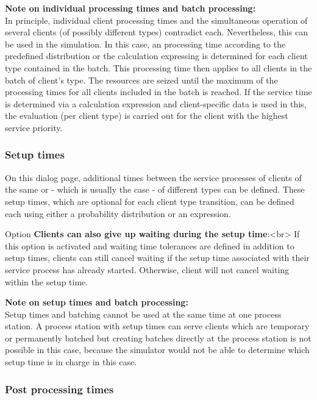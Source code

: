\textbf{Note on individual processing times and batch processing:}~\\
In principle, individual client processing times and the simultaneous operation of several clients
(of possibly different types) contradict each. Nevertheless, this can be used in the simulation.
In this case, an processing time according to the predefined distribution or the calculation expressing
is determined for each client type contained in the batch. This processing time then applies to all clients
in the batch of client's type. The resources are seized until the maximum of the processing times for all
clients included in the batch is reached. If the service time is determined via a calculation expression
and client-specific data is used in this, the evaluation (per client type) is carried out for the client
with the highest service priority.

\subsubsection*{Setup times}

On this dialog page, additional times between the service processes of clients of the same
or - which is usually the case - of different types can be defined. These setup times,
which are optional for each client type transition, can be defined each using either a
probability distribution or an expression.

Option \textbf{Clients can also give up waiting during the setup time}:<br>
If this option is activated and waiting time tolerances are defined in addition
to setup times, clients can still cancel waiting if the setup time associated
with their service process has already started. Otherwise, client will not
cancel waiting within the setup time.	

\textbf{Note on setup times and batch processing:}~\\
Setup times and batching cannot be used at the same time at one process station.
A process station with setup times can serve clients which are temporary or
permanently batched but creating batches directly at the process station is
not possible in this case, because the simulator would not be able to determine
which setup time is in charge in this case.

\subsubsection*{Post processing times}

